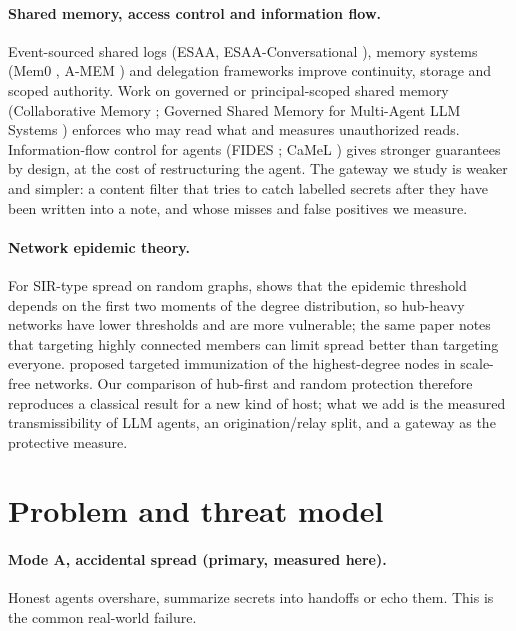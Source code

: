 \documentclass[preprint,12pt,authoryear]{elsarticle}
\begin{document}
\paragraph{Shared memory, access control and information flow.}
Event-sourced shared logs (ESAA, ESAA-Conversational \citep{esaa2026,esaac2026}), memory systems (Mem0 \citep{mem0}, A-MEM \citep{amem}) and delegation frameworks \citep{delegation2025} improve continuity, storage and scoped authority. Work on governed or principal-scoped shared memory (Collaborative Memory \citep{rezazadeh2025}; Governed Shared Memory for Multi-Agent LLM Systems \citep{anon2026h}) enforces who may read what and measures unauthorized reads. Information-flow control for agents (FIDES \citep{costa2025}; CaMeL \citep{debenedetti2025}) gives stronger guarantees by design, at the cost of restructuring the agent. The gateway we study is weaker and simpler: a content filter that tries to catch labelled secrets after they have been written into a note, and whose misses and false positives we measure.

\paragraph{Network epidemic theory.}
For SIR-type spread on random graphs, \citet{newman2002} shows that the epidemic threshold depends on the first two moments of the degree distribution, so hub-heavy networks have lower thresholds and are more vulnerable; the same paper notes that targeting highly connected members can limit spread better than targeting everyone. \citet{pastor2002} proposed targeted immunization of the highest-degree nodes in scale-free networks. Our comparison of hub-first and random protection therefore reproduces a classical result for a new kind of host; what we add is the measured transmissibility of LLM agents, an origination/relay split, and a gateway as the protective measure.

\section{Problem and threat model}
\label{sec:threat}

\paragraph{Mode A, accidental spread (primary, measured here).}
Honest agents overshare, summarize secrets into handoffs or echo them. This is the common real-world failure.
\end{document}

